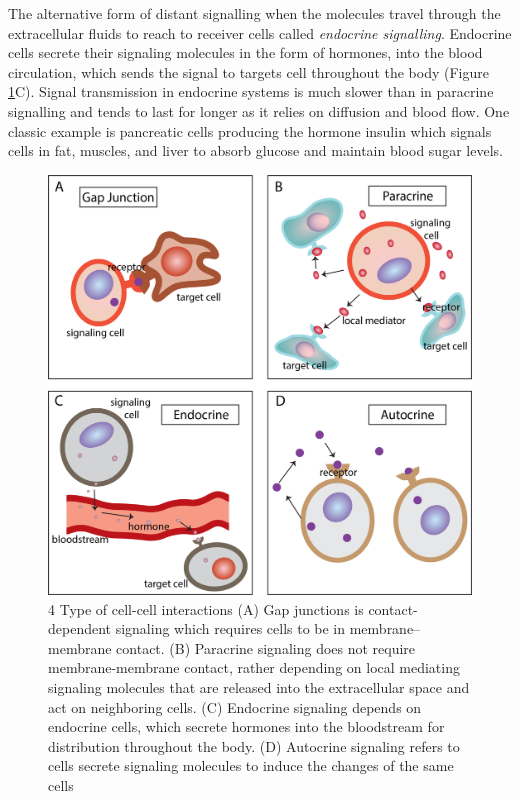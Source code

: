 The alternative form of distant signalling when the molecules travel through the extracellular fluids to reach to receiver cells called \textit{endocrine signalling}. Endocrine cells secrete their signaling molecules in the form of hormones, into the blood circulation, which sends the signal to targets cell throughout the body (Figure \ref{fig:Chap1_figure2}C). Signal transmission in endocrine systems is much slower than in paracrine signalling and tends to last for longer as it relies on diffusion and blood flow. One classic example is pancreatic cells producing the hormone insulin which signals cells in fat, muscles, and liver to absorb glucose and maintain blood sugar levels.

\begin{figure}[htp]
    \centering
    \includegraphics[width=0.8\columnwidth]{Chapter1/Figures/Chap1_figure2.png}
    \caption{4 Type of cell-cell interactions (A) Gap junctions is contact-dependent signaling which requires cells to be in membrane–membrane contact. (B) Paracrine signaling does not require membrane-membrane contact, rather depending on local mediating signaling molecules that are released into the extracellular space and act on neighboring cells. (C) Endocrine signaling depends on endocrine cells, which secrete hormones into the bloodstream for distribution throughout the body. (D) Autocrine signaling refers to cells secrete signaling molecules to induce the changes of the same cells}
    \label{fig:Chap1_figure2}
\end{figure}

